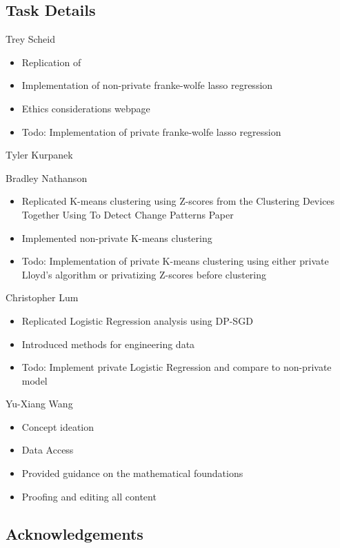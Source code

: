 \documentclass[12pt,letterpaper]{article}
\begin{document}
\subsection{Task Details}

Trey Scheid
\begin{itemize}
    \item Replication of 
    \item Implementation of non-private franke-wolfe lasso regression
    \item Ethics considerations webpage
    \item [ ] Todo: Implementation of private franke-wolfe lasso regression
\end{itemize}

Tyler Kurpanek

Bradley Nathanson
\begin{itemize}
    \item Replicated K-means clustering using Z-scores from the Clustering Devices Together Using To Detect Change Patterns Paper
    \item Implemented non-private K-means clustering 
    \item [ ] Todo: Implementation of private K-means clustering using either private Lloyd's algorithm or privatizing Z-scores before clustering
\end{itemize}

Christopher Lum
\begin{itemize}
    \item Replicated Logistic Regression analysis using DP-SGD
    \item Introduced methods for engineering data
    \item [ ] Todo: Implement private Logistic Regression and compare to non-private model
\end{itemize}

Yu-Xiang Wang
\begin{itemize}
  \item Concept ideation
  \item Data Access
  \item Provided guidance on the mathematical foundations
  \item Proofing and editing all content
\end{itemize}


\subsection{Acknowledgements}
\end{document}
